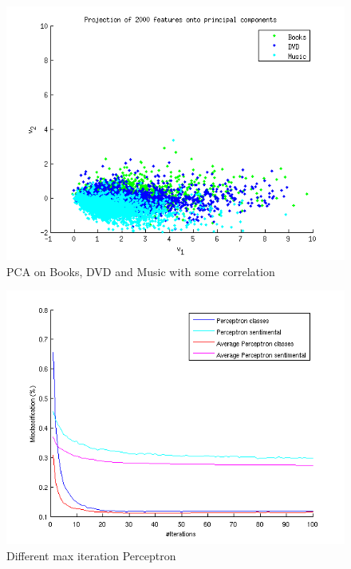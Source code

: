 \begin{figure}[H]
\centering
\includegraphics[scale = 0.5]{../Plottar/pca_somecorr.png}
\caption{PCA on Books, DVD and Music with some correlation}
\label{fig:trainingsize}
\end{figure} 

\begin{figure}[H]
\centering
\includegraphics[scale = 0.5]{../Plottar/perceptron_2000words_unigram_10foldcv_classes-high_sentimental-low.png}
\caption{Different max iteration Perceptron}
\label{fig:trainingsize}
\end{figure} 

